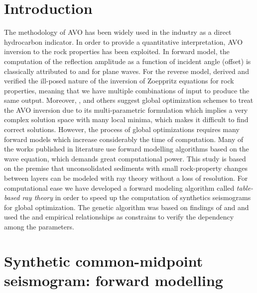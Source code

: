 \documentclass{vie16}
\begin{document}
\section{Introduction}
The methodology of AVO has been widely used in the industry as a
direct hydrocarbon indicator. In order to provide a quantitative
interpretation, AVO inversion to the rock properties has been
exploited. In forward model, the computation of the reflection
amplitude as a function of incident angle (offset) is
classically attributed to \cite{Zoeppritz1919} and
\cite{Knott1899} for plane waves. For the reverse model,
\cite{Rosa1976} derived and verified the ill-posed nature of the
inversion of Zoeppritz equations for rock properties, meaning
that we have multiple combinations of input to produce the same
output.  Moreover, \cite{Stoffa1991}, \cite{Mallick1995} and
others suggest global optimization schemes to treat the AVO
inversion due to its multi-parametric formulation which implies
a very complex solution space with many local minima, which
makes it difficult to find correct solutions. However, the
process of global optimizations requires many forward models
which increase considerably the time of computation. Many of the
works published in literature use forward modelling algorithms
based on the wave equation, which demands great computational
power. This study is based on the premise that unconsolidated
sediments with small rock-property changes between layers can be
modeled with ray theory without a loss of resolution. For
computational ease we have developed a forward modeling
algorithm called \textit{table-based ray theory} in order to
speed up the computation of synthetics seismograms for global
optimization.  The genetic algorithm was based on findings of
\cite{Stoffa1991} and \cite{Sen1992} and used the
\cite{Gardner1974} and \cite{Castagna1985} empirical
relationships as constrains to verify the dependency among the
parameters.

\section{Synthetic common-midpoint seismogram: forward
modelling} 
\end{document}
